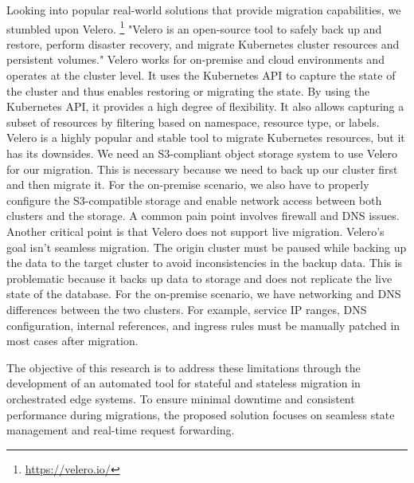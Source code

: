 Looking into popular real-world solutions that provide migration capabilities, we stumbled upon Velero. \footnote{\url{https://velero.io/}} "Velero is an open-source tool to safely back up and restore, perform disaster recovery, and migrate Kubernetes cluster resources and persistent volumes." Velero works for on-premise and cloud environments and operates at the cluster level. It uses the Kubernetes API to capture the state of the cluster and thus enables restoring or migrating the state. By using the Kubernetes API, it provides a high degree of flexibility. It also allows capturing a subset of resources by filtering based on namespace, resource type, or labels. Velero is a highly popular and stable tool to migrate Kubernetes resources, but it has its downsides. We need an S3-compliant object storage system to use Velero for our migration. This is necessary because we need to back up our cluster first and then migrate it. For the on-premise scenario, we also have to properly configure the S3-compatible storage and enable network access between both clusters and the storage. A common pain point involves firewall and DNS issues. Another critical point is that Velero does not support live migration. Velero's goal isn't seamless migration. The origin cluster must be paused while backing up the data to the target cluster to avoid inconsistencies in the backup data. This is problematic because it backs up data to storage and does not replicate the live state of the database. For the on-premise scenario, we have networking and DNS differences between the two clusters. For example, service IP ranges, DNS configuration, internal references, and ingress rules must be manually patched in most cases after migration.

The objective of this research is to address these limitations through the development of an automated tool for stateful and stateless migration in orchestrated edge systems. To ensure minimal downtime and consistent performance during migrations, the proposed solution focuses on seamless state management and real-time request forwarding.